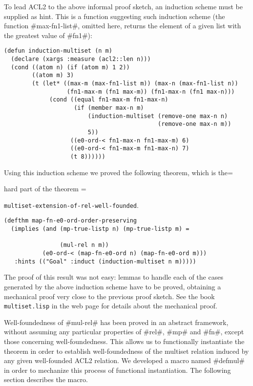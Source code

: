 \documentclass[11pt]{llncs}
\begin{document}
{To lead ACL2 to the above informal proof sketch, an induction scheme
must be supplied as hint. This is a function suggesting such induction
scheme (the function #max-fn1-list#, omitted here, returns the
element of a given list with the greatest value of #fn1#):

\begin{verbatim}
(defun induction-multiset (n m)
  (declare (xargs :measure (acl2::len n)))
  (cond ((atom n) (if (atom m) 1 2))
        ((atom m) 3)
        (t (let* ((max-m (max-fn1-list m)) (max-n (max-fn1-list n))
                  (fn1-max-m (fn1 max-m)) (fn1-max-n (fn1 max-n)))
             (cond ((equal fn1-max-m fn1-max-n)
                    (if (member max-n m)
                        (induction-multiset (remove-one max-n n)
                                            (remove-one max-n m))
                        5))
                   ((e0-ord-< fn1-max-n fn1-max-m) 6)
                   ((e0-ord-< fn1-max-m fn1-max-n) 7)
                   (t 8))))))
\end{verbatim}

Using this induction scheme we proved the following theorem, which is the=

hard part of the theorem  =

{\tt mul\-ti\-set\--ex\-ten\-sion\--of\--rel\--well\--foun\-ded}.


\begin{verbatim}
(defthm map-fn-e0-ord-order-preserving
  (implies (and (mp-true-listp n) (mp-true-listp m) =

                (mul-rel n m))
           (e0-ord-< (map-fn-e0-ord n) (map-fn-e0-ord m)))
   :hints (("Goal" :induct (induction-multiset n m)))))
\end{verbatim}

The proof of this result was not easy: lemmas to handle each of the
cases generated by the above induction scheme have to be proved,
obtaining a mechanical proof very close to the previous proof
sketch. See the book {\tt mul\-ti\-set.\-lisp} in the web page for
details about the mechanical proof.

Well-foundedness of #mul-rel# has been proved in an abstract framework,
without assuming any particular properties of #rel#, #mp# and
#fn#, except those concerning well-foundedness. This allows
us to functionally instantiate the theorem in order to establish
well-foundedness of the multiset relation induced by any given
well-founded ACL2 relation. We developed a macro named #defmul# in order
to mechanize this process of functional instantiation. The following
section describes the macro.

}
\end{document}
